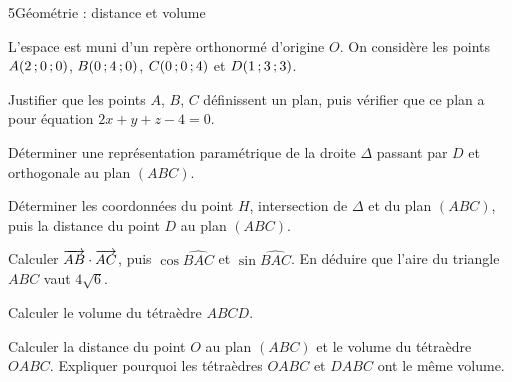 \begin{exoBac}{5}{Géométrie : distance et volume}
\begin{codecote}[0.6]
L'espace est muni d'un repère orthonormé d'origine $O$. On considère les points $A(2\,{;}\,0\,{;}\,0)$, $B(0\,{;}\,4\,{;}\,0)$, $C(0\,{;}\,0\,{;}\,4)$ et
$D(1\,{;}\,3\,{;}\,3)$.
\begin{questions}
  \item Justifier que les points $A$, $B$, $C$ définissent un plan, puis vérifier que ce plan a pour équation $2x+y+z-4=0$.
  \item Déterminer une représentation paramétrique de la droite $\Delta$ passant par $D$ et orthogonale au plan $(ABC)$.
\end{questions}
\cote
\centering
{}
\end{codecote}
\begin{questions}[start=3]
  \item Déterminer les coordonnées du point $H$, intersection de $\Delta$ et du plan $(ABC)$, puis la distance du point $D$ au plan $(ABC)$.
  \item Calculer $\overrightarrow{AB}\cdot\overrightarrow{AC}$, puis $\cos\widehat{BAC}$ et $\sin\widehat{BAC}$. En déduire que l'aire du triangle $ABC$ vaut
    $4\sqrt6$.
  \item Calculer le volume du tétraèdre $ABCD$.
  \item Calculer la distance du point $O$ au plan $(ABC)$ et le volume du tétraèdre $OABC$. Expliquer pourquoi les tétraèdres $OABC$ et
    $DABC$ ont le même volume.
\end{questions}
\end{exoBac}

